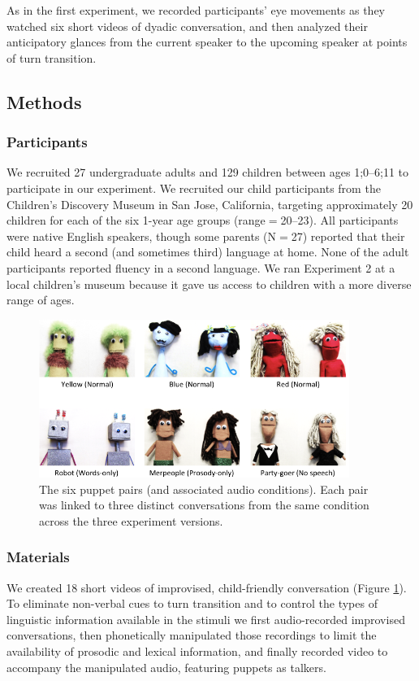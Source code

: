 \documentclass[authoryear, 12pt]{elsarticle}
\begin{document}
As in the first experiment, we recorded participants' eye movements as they watched six short videos of dyadic conversation, and then analyzed their anticipatory glances from the current speaker to the upcoming speaker at points of turn transition.

\subsection{Methods}
\label{sec:methods2}

\subsubsection{Participants}
We recruited 27 undergraduate adults and 129 children between ages 1;0--6;11 to participate in our experiment. We recruited our child participants from the Children's Discovery Museum in San Jose, California, targeting approximately 20 children for each of the six 1-year age groups (range$=$20--23). All participants were native English speakers, though some parents (N$=$27) reported that their child heard a second (and sometimes third) language at home. None of the adult participants reported fluency in a second language. We ran Experiment 2 at a local children's museum because it gave us access to children with a more diverse range of ages.

\begin{figure}[t]
\begin{center}
\includegraphics[width=0.9\textwidth]{figures/FIG-EN-stim.png}
\end{center}
\caption{The six puppet pairs (and associated audio conditions). Each pair was linked to three distinct conversations from the same condition across the three experiment versions.}
\label{fig:puppets}
\end{figure}

\subsubsection{Materials}
We created 18 short videos of improvised, child-friendly conversation (Figure \ref{fig:puppets}). To eliminate non-verbal cues to turn transition and to control the types of linguistic information available in the stimuli we first audio-recorded improvised conversations, then phonetically manipulated those recordings to limit the availability of prosodic and lexical information, and finally recorded video to accompany the manipulated audio, featuring puppets as talkers. 
\end{document}

